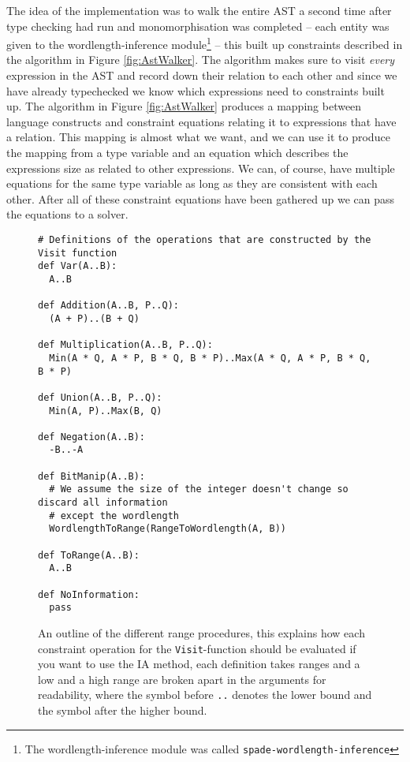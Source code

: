 The idea of the implementation was to walk the entire AST a second time after type checking had run and monomorphisation was completed -- each entity was given to the wordlength-inference module\cprotect\footnote{The wordlength-inference module was called \verb+spade-wordlength-inference+} -- this built up constraints described in the algorithm in Figure \ref{fig:AstWalker}. The algorithm makes sure to visit \textit{every} expression in the AST and record down their relation to each other and since we have already typechecked we know which expressions need to constraints built up. The algorithm in Figure \ref{fig:AstWalker} produces a mapping between language constructs and constraint equations relating it to expressions that have a relation. This mapping is almost what we want, and we can use it to produce the mapping from a type variable and an equation which describes the expressions size as related to other expressions. We can, of course, have multiple equations for the same type variable as long as they are consistent with each other. After all of these constraint equations have been gathered up we can pass the equations to a solver. 

\begin{figure}[h!]
\begin{verbatim}
# Definitions of the operations that are constructed by the Visit function
def Var(A..B):
  A..B

def Addition(A..B, P..Q):
  (A + P)..(B + Q)

def Multiplication(A..B, P..Q):
  Min(A * Q, A * P, B * Q, B * P)..Max(A * Q, A * P, B * Q, B * P)

def Union(A..B, P..Q):
  Min(A, P)..Max(B, Q)

def Negation(A..B):
  -B..-A

def BitManip(A..B):
  # We assume the size of the integer doesn't change so discard all information
  # except the wordlength
  WordlengthToRange(RangeToWordlength(A, B))

def ToRange(A..B):
  A..B

def NoInformation:
  pass

\end{verbatim}
  \cprotect\caption{An outline of the different range procedures, this explains how each constraint operation for the \verb+Visit+-function should be evaluated if you want to use the IA method, each definition takes ranges and a low and a high range are broken apart in the arguments for readability, where the symbol before \verb+..+ denotes the lower bound and the symbol after the higher bound.}
\label{fig:IaInference}
\end{figure}

